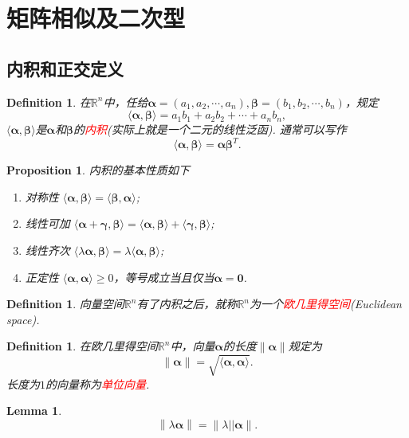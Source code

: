 \documentclass{article}
\newtheorem{lemma}[theorem]{Lemma}
\newtheorem{proposition}[theorem]{Proposition}
\newtheorem{definition}[theorem]{Definition}
\newcommand{\norm}[1]{\left\lVert#1\right\rVert} %
\newcommand{\mbf}[1]{\bm{#1}}
\newcommand\inp[2]{\langle #1, #2 \rangle} %
\newcommand{\redt}[1]{\textcolor{red}{#1}}
\begin{document}
\newpage
\section{矩阵相似及二次型}

\subsection{内积和正交定义}
\begin{definition}
\rm 在$\mathbb{R}^n$中，任给$\mbf{\alpha}=(a_1,a_2,\cdots,a_n), \mbf{\beta} = (b_1,b_2,\cdots,b_n)$，规定
$$
\inp{\mbf{\alpha}}{\mbf{\beta}} = a_1b_1 + a_2b_2 + \cdots +a_nb_n,
$$
$\inp{\mbf{\alpha}}{\mbf{\beta}}$是$\mbf{\alpha}$和$\mbf{\beta}$的\redt{内积}(实际上就是一个二元的线性泛函). 通常可以写作
$$
\inp{\mbf{\alpha}}{\mbf{\beta}} = \mbf{\alpha}\mbf{\beta}^{T}.
$$
\end{definition}

\begin{proposition}
\rm 内积的基本性质如下
\begin{enumerate}
	\item 对称性 $\inp{\mbf{\alpha}}{\mbf{\beta}} = \inp{\mbf{\beta}}{\mbf{\alpha}}$;
	\item 线性可加 $\inp{\mbf{\alpha}+\mbf{\gamma}}{\mbf{\beta}} = \inp{\mbf{\alpha}}{\mbf{\beta}} + \inp{\mbf{\gamma}}{\mbf{\beta}}$;
	\item 线性齐次 $\inp{\lambda\mbf{\alpha}}{\mbf{\beta}} = \lambda \inp{\mbf{\alpha}}{\mbf{\beta}}$;
	\item 正定性 $\inp{\mbf{\alpha}}{\mbf{\alpha}} \geq 0$，等号成立当且仅当$\mbf{\alpha} = \mbf{0}$.
\end{enumerate}
\end{proposition}

\begin{definition}
\rm 向量空间$\mathbb{R}^n$有了内积之后，就称$\mathbb{R}^n$为一个\redt{欧几里得空间}(Euclidean space).
\end{definition}

\begin{definition}
\rm 在欧几里得空间$\mathbb{R}^n$中，向量$\mbf{\alpha}$的长度$\norm{\mbf{\alpha}}$规定为
$$
\norm{\mbf{\alpha}} = \sqrt{\inp{\mbf{\alpha}}{\mbf{\alpha}}}.
$$
长度为$1$的向量称为\redt{单位向量}. 
\end{definition}

\begin{lemma}
$$
\norm{\lambda \mbf{\alpha}} = \norm{\lambda||\mbf{\alpha}}.
$$
\end{lemma}
\end{document}
